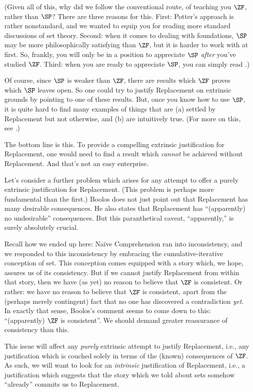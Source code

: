 \documentclass[../../../include/open-logic-section]{subfiles}
\begin{document}
(Given all of this, why did we follow the conventional route, of
teaching you $\ZF$, rather than $\SP$? There are three reasons for
this. First: Potter's approach is rather nonstandard, and we wanted to
equip you for reading more standard discussions of set theory. Second:
when it comes to dealing with foundations, $\SP$ may be more
philosophically satisfying than $\ZF$, but it is harder to work with
at first. So, frankly, you will only be in a position to appreciate
$\SP$ \emph{after} you've studied $\ZF$. Third: when you are ready to
appreciate $\SP$, you can simply read \citealt{Potter2004}.)

Of course, since $\SP$ is weaker than $\ZF$, there are results which
$\ZF$ proves which $\SP$ leaves open. So one could try to justify
Replacement on extrinsic grounds by pointing to one of these results.
But, once you know how to use $\SP$, it is quite hard to find many
examples of things that are (a) settled by Replacement but not
otherwise, and (b) are intuitively true. (For more on this, see
\citealt[\S13.2]{Potter2004}.)

The bottom line is this. To provide a compelling extrinsic
justification for Replacement, one would need to find a result which
\emph{cannot} be achieved without Replacement. And that's not an easy
enterprise. 

Let's consider a further problem which arises for any attempt to offer
a purely extrinsic justification for Replacement. (This problem is
perhaps more fundamental than the first.) Boolos does not just point
out that Replacement has many desirable consequences. He also states
that Replacement has ``(apparently) no undesirable'' consequences. But
this paranthetical caveat, ``apparently,'' is surely absolutely
crucial.

Recall how we ended up here: Na\"ive Comprehension ran into
inconsistency, and we responded to this inconsistency by embracing the
cumulative-iterative conception of set. This conception comes equipped
with a story which, we hope, assures us of its consistency. But if we
cannot justify Replacement from within that story, then we have (as
yet) no reason to believe that $\ZF$ is consistent. Or rather: we have
no reason to believe that $\ZF$ is consistent, apart from the (perhaps
merely contingent) fact that no one has discovered a contradiction
\emph{yet}. In exactly that sense, Boolos's comment seems to come down
to this: ``(apparently) $\ZF$ is consistent''. We should demand
greater reassurance of consistency than this. 

This issue will affect any \emph{purely} extrinsic attempt to justify
Replacement, i.e., any justification which is couched solely in terms
of the (known) consequences of $\ZF$. As such, we will want to look
for an \emph{intrinsic} justification of Replacement, i.e., a
justification which suggests that the story which we told about sets
somehow ``already'' commits us to Replacement. 
\end{document}
